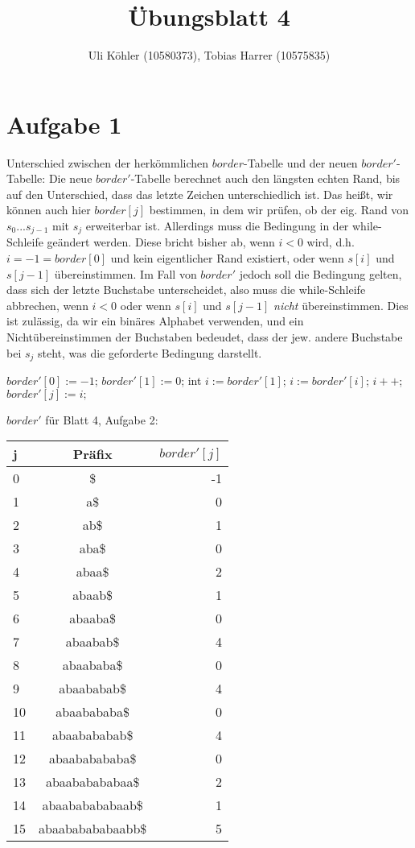 \documentclass[a4paper,10pt,oneside,leqno]{scrartcl}
\title{Übungsblatt 4}
\author{Uli Köhler (10580373), Tobias Harrer (10575835)}
\begin{document}
\maketitle

\section*{Aufgabe 1}
Unterschied zwischen der herkömmlichen $border$-Tabelle und der neuen $border'$-Tabelle: Die neue $border'$-Tabelle berechnet auch den
längsten echten Rand, bis auf den Unterschied, dass das letzte Zeichen unterschiedlich ist. Das heißt, wir können auch hier $border[j]$
bestimmen, in dem wir prüfen, ob der eig. Rand von $s_0...s_{j-1}$ mit $s_j$ erweiterbar ist. Allerdings muss die Bedingung in der while-
Schleife geändert werden. Diese bricht bisher ab, wenn $i<0$ wird, d.h. $i=-1=border[0]$ und kein eigentlicher Rand existiert, oder wenn
$s[i]$ und $s[j-1]$ übereinstimmen. Im Fall von $border'$ jedoch soll die Bedingung gelten, dass sich der letzte Buchstabe unterscheidet,
also muss die while-Schleife abbrechen, wenn $i<0$ oder wenn $s[i]$ und $s[j-1]$ \textit{nicht} übereinstimmen. Dies ist zulässig, da wir
ein binäres Alphabet verwenden, und ein Nichtübereinstimmen der Buchstaben bedeudet, dass der jew. andere Buchstabe bei $s_j$ steht, was die
geforderte Bedingung darstellt.
\begin{algorithmic}
\State $border'[0] := -1$;
\State $border'[1] := 0$;
\State int $i := border'[1]$;
    \State $i := border'[i]$;
  \EndWhile
  \State $i++$;
  \State $border'[j] := i;$
\EndFor
\EndFunction
\end{algorithmic}
$border'$ für Blatt 4, Aufgabe 2:\newline
\begin{tabular}{l|c|r}
\textbf{j} & \textbf{Präfix} & \textbf{$border'[j]$}\\\hline
0 &\$ & -1\\
1 &a\$ & 0\\
2 &ab\$ & 1\\
3 &aba\$ & 0\\
4 &abaa\$ &  2\\
5 &abaab\$  & 1\\
6 &abaaba\$  & 0\\
7 &abaabab\$ & 4\\
8 &abaababa\$ & 0\\
9 &abaababab\$ & 4\\
10&abaabababa\$ & 0\\
11&abaabababab\$ & 4\\
12&abaababababa\$ & 0\\
13&abaababababaa\$ & 2\\
14&abaababababaab\$ & 1\\
15&abaababababaabb\$ & 5\\
\end{tabular}\newline\newline
\end{document}
